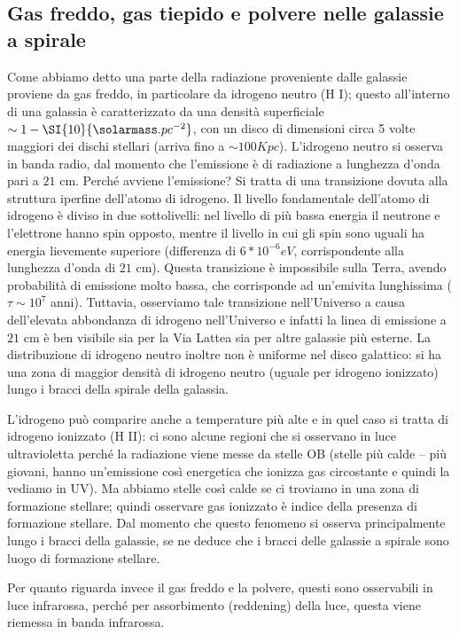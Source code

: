 \subsection{Gas freddo, gas tiepido e polvere nelle galassie a spirale}
Come abbiamo detto una parte della radiazione proveniente dalle galassie proviene da gas freddo, in particolare da idrogeno neutro (H I); questo all'interno di una galassia è caratterizzato da una densità superficiale $ \sim 1 -\SI{10}{\solarmass.pc^{-2}}$, con un disco di dimensioni circa 5 volte maggiori dei dischi stellari (arriva fino a $\sim 100 Kpc$). L'idrogeno neutro si osserva in banda radio, dal momento che l'emissione è di radiazione a lunghezza d’onda pari a $21$ cm. Perché avviene l'emissione? Si tratta di una transizione dovuta alla struttura iperfine dell’atomo di idrogeno. Il livello fondamentale dell’atomo di idrogeno è diviso in due sottolivelli: nel livello di più bassa energia il neutrone e l’elettrone hanno spin opposto, mentre il livello in cui gli spin sono uguali ha energia lievemente superiore (differenza di $6*10^{-6}eV$, corrispondente alla lunghezza d’onda di $21$ cm). Questa transizione è impossibile sulla Terra, avendo probabilità di emissione molto bassa, che corrisponde ad un'emivita lunghissima ($\tau \sim 10^7$ anni). Tuttavia, osserviamo tale transizione nell’Universo a causa dell’elevata abbondanza di idrogeno nell’Universo e infatti la linea di emissione a $21$ cm è ben visibile sia per la Via Lattea sia per altre galassie più esterne. La distribuzione di idrogeno neutro inoltre non è uniforme nel disco galattico: si ha una zona di maggior densità di idrogeno neutro (uguale per idrogeno ionizzato) lungo i bracci della spirale della galassia. 

L'idrogeno può comparire anche a temperature più alte e in quel caso si tratta di idrogeno ionizzato (H II): ci sono alcune regioni che si osservano in luce ultravioletta perché la radiazione viene messe da stelle OB (stelle più calde – più giovani, hanno un'emissione così energetica che ionizza gas circostante e quindi la vediamo in UV). Ma abbiamo stelle così calde se ci troviamo in una zona di formazione stellare; quindi osservare gas ionizzato è indice della presenza di formazione stellare. Dal momento che questo fenomeno si osserva principalmente lungo i bracci della galassie, se ne deduce che i bracci delle galassie a spirale sono luogo di formazione stellare. 

Per quanto riguarda invece il gas freddo e la polvere, questi sono osservabili in luce infrarossa, perché per assorbimento (reddening) della luce, questa viene riemessa in banda infrarossa. 